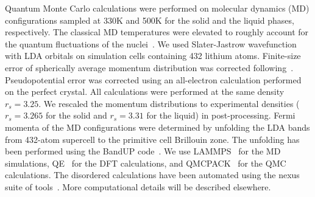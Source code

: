 \documentclass[twocolumn,showpacs,showkeys,fleqn,prl,superscriptaddress]{revtex4}%
\begin{document}
\vspace{10mm}

Quantum Monte Carlo calculations were performed on molecular dynamics (MD) configurations sampled at 330K and 500K for the solid and the liquid phases, respectively. The classical MD temperatures were elevated to roughly account for the quantum fluctuations of the nuclei~\cite{filippi98}. We used Slater-Jastrow wavefunction with LDA orbitals on simulation cells containing 432 lithium atoms. Finite-size error of spherically average momentum distribution was corrected following~\cite{holz09}. Pseudopotential error was corrected using an all-electron calculation performed on the perfect crystal. All calculations were performed at the same density $r_s=3.25$. We rescaled the momentum distributions to experimental densities ($r_s=3.265$ for the solid and $r_s=3.31$ for the liquid) in post-processing. Fermi momenta of the MD configurations were determined by unfolding the LDA bands from 432-atom supercell to the primitive cell Brillouin zone. The unfolding has been performed using the BandUP code~\cite{Medeiros2014,Medeiros2015}.  We use LAMMPS~\cite{Plimpton1993} for the MD simulations, QE~\cite{Giannozzi2009,Enkovaara2017} for the DFT calculations, and QMCPACK~\cite{Kim2018} for the QMC calculations. The disordered calculations have been automated using the nexus suite of tools~\cite{Krogel2016}.
More computational details will be described elsewhere.

\vspace{10mm}
\end{document}
